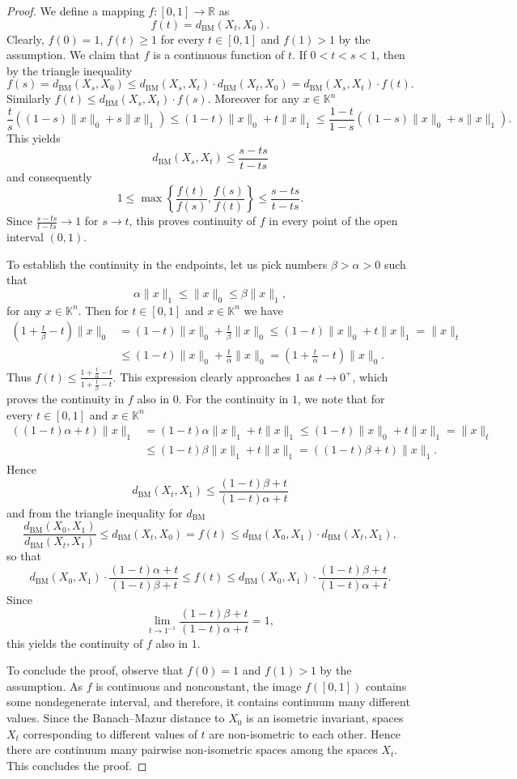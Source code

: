\documentclass[10pt,a4paper]{amsart}
\newcommand\dbm{d_{\mathrm{BM}}}
\begin{document}
\begin{proof}

We define a mapping $f:[0, 1] \to \mathbb{R}$ as
$$f(t) = \dbm(X_t, X_0).$$
Clearly, $f(0)=1$, $f(t) \geq 1$ for every $t \in [0, 1]$ and $f(1)>1$ by the assumption. We claim that $f$ is a continuous function of $t$. If $0 < t < s < 1$, then by the triangle inequality
$$f(s) = \dbm(X_s, X_0) \leq \dbm(X_s, X_t) \cdot \dbm(X_t, X_0) = \dbm(X_s, X_t) \cdot f(t).$$
Similarly $f(t) \leq \dbm(X_s, X_t) \cdot f(s)$. Moreover for any $x \in \mathbb{K}^n$
$$\frac{t}{s} \left( (1-s)\|x\|_0 + s\|x\|_1  \right ) \leq (1-t)\|x\|_0 + t \|x\|_1 \leq \frac{1-t}{1-s} \left ((1-s)\|x\|_0 + s \|x\|_1 \right ).$$
This yields
$$\dbm(X_s, X_t) \leq \frac{s-ts}{t-ts}$$
and consequently
$$1 \leq \max \left \{ \frac{f(t)}{f(s)}, \frac{f(s)}{f(t)} \right \} \leq \frac{s-ts}{t-ts}.$$
Since $\frac{s-ts}{t-ts} \to 1$ for $s \to t$, this proves continuity of $f$ in every point of the open interval $(0, 1)$.


To establish the continuity in the endpoints, let us pick numbers $\beta > \alpha >0$ such that 
$$\alpha \|x\|_1 \leq \|x\|_0 \leq \beta\|x\|_1,$$
for any $x \in \mathbb{K}^n$. Then for $t \in [0, 1]$ and $x \in \mathbb{K}^n$ we have
\begin{align*}
\left ( 1 + \frac{t}{\beta} - t \right ) \|x\|_0 &=  (1-t) \|x\|_0 + \frac{t}{\beta} \|x\|_0 \leq (1-t) \|x\|_0 + t \|x\|_1 = \|x\|_t \\
 &\leq (1-t) \|x\|_0 + \frac{t}{\alpha} \|x\|_0 = \left ( 1 + \frac{t}{\alpha} - t \right ) \|x\|_0.
\end{align*}
Thus $f(t) \leq \frac{ 1 + \frac{t}{\alpha} - t}{1 + \frac{t}{\beta} - t}$. This expression clearly approaches $1$ as $t \to 0^{+}$, which proves the continuity in $f$ also in $0$. For the continuity in $1$, we note that for every $t \in [0, 1]$ and $x \in \mathbb{K}^n$
\begin{align*}
\left ((1-t)\alpha + t \right ) \|x\|_1  &= (1-t)\alpha \|x\|_1 + t \|x\|_1 \leq (1-t)\|x\|_0 + t\|x\|_1 = \|x\|_t \\
&\leq (1-t) \beta \|x\|_1 + t \|x\|_1 = ((1-t)\beta + t) \|x\|_1.
\end{align*}
Hence
$$\dbm(X_t, X_1) \leq \frac{(1-t)\beta + t}{(1-t)\alpha + t}$$
and from the triangle inequality for $\dbm$
$$\frac{\dbm(X_0, X_1)}{\dbm(X_t, X_1)} \leq \dbm(X_t, X_0) = f(t) \leq \dbm(X_0, X_1) \cdot \dbm(X_t, X_1),$$
so that
$$\dbm(X_0, X_1) \cdot \frac{(1-t)\alpha + t}{(1-t)\beta + t} \leq f(t) \leq \dbm(X_0, X_1) \cdot \frac{(1-t)\beta + t}{(1-t)\alpha + t}.$$
Since 
$$\lim_{t \to 1^{-1}} \frac{(1-t)\beta + t}{(1-t)\alpha + t} = 1, $$
this yields the continuity of $f$ also in $1$.

To conclude the proof, observe that $f(0)=1$ and $f(1)>1$ by the assumption. As $f$ is continuous and nonconstant, the image $f([0, 1])$ contains some nondegenerate interval, and therefore, it contains continuum many different values. Since the Banach--Mazur distance to $X_0$ is an isometric invariant, spaces $X_t$ corresponding to different values of $t$ are non-isometric to each other. Hence there are continuum many pairwise non-isometric spaces among the spaces $X_t$. This concludes the proof.

\end{proof}
\end{document}
